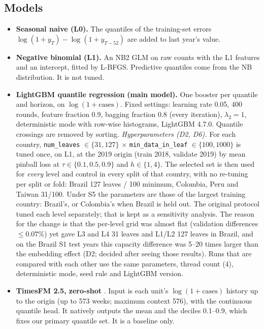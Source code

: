 \documentclass[11pt]{article}
\begin{document}
\subsection{Models}
\begin{itemize}
  \item \textbf{Seasonal naive (L0).} The quantiles of the training-set errors
  $\log(1+y_T)-\log(1+y_{T-52})$ are added to last year's value.
  \item \textbf{Negative binomial (L1).} An NB2 GLM on raw counts with the L1 features and an intercept, fitted by L-BFGS.
  Predictive quantiles come from the NB distribution. It is not tuned.
  \item \textbf{LightGBM quantile regression} \citep{ke2017lightgbm} \textbf{(main model).}
  One booster per quantile and horizon, on $\log(1+\text{cases})$. Fixed settings: learning rate 0.05,
  400 rounds, feature fraction 0.9, bagging fraction 0.8 (every iteration), $\lambda_2=1$, deterministic
  mode with row-wise histograms, LightGBM 4.7.0. Quantile crossings are removed by sorting.
  \emph{Hyperparameters (D2, D6).} For each country, \texttt{num\_leaves} $\in\{31,127\}$ $\times$
  \texttt{min\_data\_in\_leaf} $\in\{100,1000\}$ is tuned once, on L1, at the 2019 origin (train 2018,
  validate 2019) by mean pinball loss at $\tau\in\{0.1,0.5,0.9\}$ and $h\in\{1,4\}$. The selected set is
  then used for \emph{every} level and control in every split of that country, with no re-tuning per
  split or fold: Brazil 127 leaves / 100 minimum, Colombia, Peru and Taiwan 31/100. Under S5 the
  parameters are those of the largest training country: Brazil's, or Colombia's when Brazil is held out.
  The original protocol tuned each level separately; that is kept as a sensitivity analysis. The reason
  for the change is that the per-level grid was almost flat (validation differences $\leq 0.07\%$) yet
  gave L3 and L4 31 leaves and L1/L2 127 leaves in Brazil, and on the Brazil S1 test years this capacity
  difference was 5--20 times larger than the embedding effect (D2; decided after seeing those results).
  Runs that are compared with each other use the same parameters, thread count (4), deterministic mode,
  seed rule and LightGBM version.
  \item \textbf{TimesFM 2.5, zero-shot} \citep{das2024timesfm,timesfm25}. Input is each unit's
  $\log(1+\text{cases})$ history up to the origin (up to 573 weeks; maximum context 576), with the continuous quantile head.
  It natively outputs the mean and the deciles 0.1--0.9, which fixes our primary quantile set. It is a
  baseline only.
\end{itemize}
\end{document}
